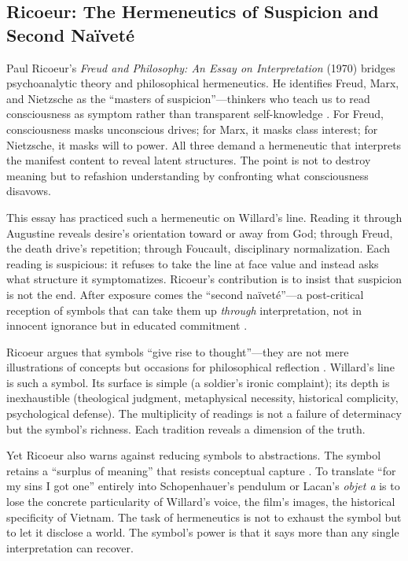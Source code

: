 \subsection*{Ricoeur: The Hermeneutics of Suspicion and Second Naïveté}
\label{ssec:vi-ricoeur}

Paul Ricoeur's \textit{Freud and Philosophy: An Essay on Interpretation} (1970) bridges
psychoanalytic theory and philosophical hermeneutics. He identifies Freud, Marx, and Nietzsche
as the ``masters of suspicion''---thinkers who teach us to read consciousness as symptom
rather than transparent self-knowledge \parencite{RicoeurSymbol1970}. For Freud, consciousness
masks unconscious drives; for Marx, it masks class interest; for Nietzsche, it masks will to
power. All three demand a hermeneutic that interprets the manifest content to reveal latent
structures. The point is not to destroy meaning but to refashion understanding by confronting
what consciousness disavows.

This essay has practiced such a hermeneutic on Willard's line. Reading it through Augustine
reveals desire's orientation toward or away from God; through Freud, the death drive's
repetition; through Foucault, disciplinary normalization. Each reading is suspicious: it
refuses to take the line at face value and instead asks what structure it symptomatizes.
Ricoeur's contribution is to insist that suspicion is not the end. After exposure comes the
``second naïveté''---a post-critical reception of symbols that can take them up
\emph{through} interpretation, not in innocent ignorance but in educated commitment
\parencite{RicoeurSymbol1970}.

Ricoeur argues that symbols ``give rise to thought''---they are not mere illustrations of
concepts but occasions for philosophical reflection \parencite[p.~347]{RicoeurSymbol1970}.
Willard's line is such a symbol. Its surface is simple (a soldier's ironic complaint); its
depth is inexhaustible (theological judgment, metaphysical necessity, historical complicity,
psychological defense). The multiplicity of readings is not a failure of determinacy but the
symbol's richness. Each tradition reveals a dimension of the truth.

Yet Ricoeur also warns against reducing symbols to abstractions. The symbol retains a
``surplus of meaning'' that resists conceptual capture \parencite{RicoeurSymbol1970}. To
translate ``for my sins I got one'' entirely into Schopenhauer's pendulum or Lacan's
\emph{objet a} is to lose the concrete particularity of Willard's voice, the film's images,
the historical specificity of Vietnam. The task of hermeneutics is not to exhaust the symbol
but to let it disclose a world. The symbol's power is that it says more than any single
interpretation can recover.

